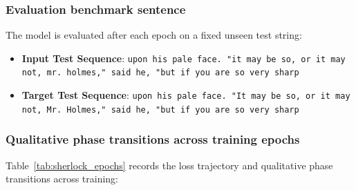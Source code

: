 \documentclass[../../main.tex]{subfiles}
\begin{document}
\subsubsection{Evaluation benchmark sentence}
The model is evaluated after each epoch on a fixed unseen test string:
\begin{itemize}
    \item \textbf{Input Test Sequence}: \texttt{upon his pale face. "it may be so, or it may not, mr. holmes," said he, "but if you are so very sharp}
    \item \textbf{Target Test Sequence}: \texttt{upon his pale face. "It may be so, or it may not, Mr. Holmes," said he, "but if you are so very sharp}
\end{itemize}

\subsubsection{Qualitative phase transitions across training epochs}
Table~\ref{tab:sherlock_epochs} records the loss trajectory and qualitative phase transitions across training:
\end{document}
